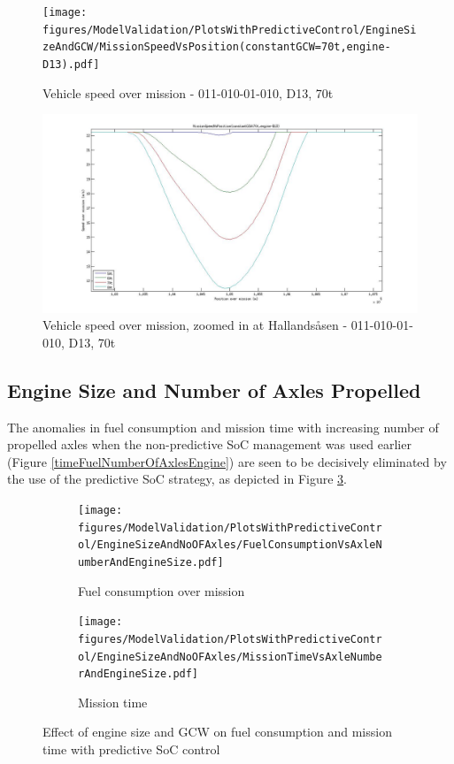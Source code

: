 \documentclass[ExampleMasters.tex]{subfiles}
\begin{document}
\begin{figure}[h!]
\centering
\texttt{[image: figures/ModelValidation/PlotsWithPredictiveControl/EngineSizeAndGCW/MissionSpeedVsPosition(constantGCW=70t,engine-D13).pdf]}
\caption{Vehicle speed over mission - 011-010-01-010, D13, 70t}
\label{speedEngineDownsizingPredictiveSoC}
\end{figure} 

\begin{figure}[h!]
\centering
\includegraphics[width=\linewidth]{figures/ModelValidation/PlotsWithPredictiveControl/EngineSizeAndGCW/MissionSpeedZoomedInD13.jpg}
\caption{Vehicle speed over mission, zoomed in at Hallands\aa sen - 011-010-01-010, D13, 70t}
\label{speedZoomedEngineDownsizingPredictiveSoC}
\end{figure} 

\subsection{Engine Size and Number of Axles Propelled}
The anomalies in fuel consumption and mission time with increasing number of propelled axles when the non-predictive SoC management was used earlier (Figure \ref{timeFuelNumberOfAxlesEngine}) are seen to be decisively eliminated by the use of the predictive SoC strategy, as depicted in Figure \ref{timeFuelAxleEnginePredictiveSoC}.\\

\begin{figure}[h!]
\begin{subfigure}{.5\textwidth}
	\centering
	\texttt{[image: figures/ModelValidation/PlotsWithPredictiveControl/EngineSizeAndNoOFAxles/FuelConsumptionVsAxleNumberAndEngineSize.pdf]}
	\caption{Fuel consumption over mission}
\end{subfigure}
\begin{subfigure}{.5\textwidth}
	\centering
	\texttt{[image: figures/ModelValidation/PlotsWithPredictiveControl/EngineSizeAndNoOFAxles/MissionTimeVsAxleNumberAndEngineSize.pdf]}
	\caption{Mission time}
\end{subfigure}
\caption{Effect of engine size and GCW on fuel consumption and mission time with predictive SoC control}
\label{timeFuelAxleEnginePredictiveSoC}
\end{figure}
\end{document}
